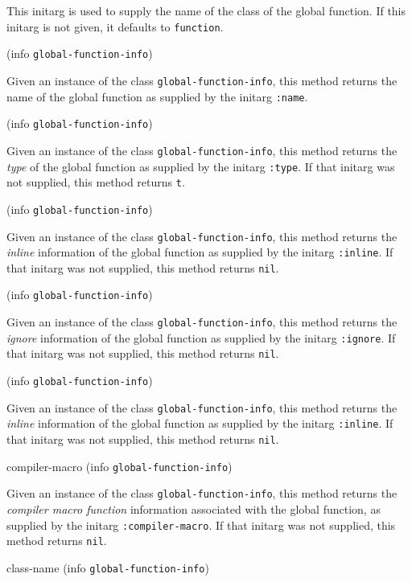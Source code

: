
This initarg is used to supply the name of the class of the global
function.  If this initarg is not given, it defaults to
\texttt{function}.

 {(info {\tt global-function-info})}

Given an instance of the class \texttt{global-function-info}, this
method returns the name of the global function as supplied by the
initarg \texttt{:name}.

 {(info {\tt global-function-info})}

Given an instance of the class \texttt{global-function-info}, this
method returns the \emph{type} of the global function as supplied by the
initarg \texttt{:type}.  If that initarg was not supplied, this method
returns \texttt{t}.

 {(info {\tt global-function-info})}

Given an instance of the class \texttt{global-function-info}, this
method returns the \emph{inline} information of the global function as
supplied by the initarg \texttt{:inline}.  If that initarg was not
supplied, this method returns \texttt{nil}.

 {(info {\tt global-function-info})}

Given an instance of the class \texttt{global-function-info}, this
method returns the \emph{ignore} information of the global function as
supplied by the initarg \texttt{:ignore}.  If that initarg was not
supplied, this method returns \texttt{nil}.

 {(info {\tt global-function-info})}

Given an instance of the class \texttt{global-function-info}, this
method returns the \emph{inline} information of the global function as
supplied by the initarg \texttt{:inline}. If that initarg was not
supplied, this method returns \texttt{nil}.

\Defmethod compiler-macro {(info {\tt global-function-info})}

Given an instance of the class \texttt{global-function-info}, this
method returns the \emph{compiler macro function} information
associated with the global function, as supplied by the initarg
\texttt{:compiler-macro}.  If that initarg was not supplied, this
method returns \texttt{nil}.

\Defmethod class-name {(info {\tt global-function-info})}

